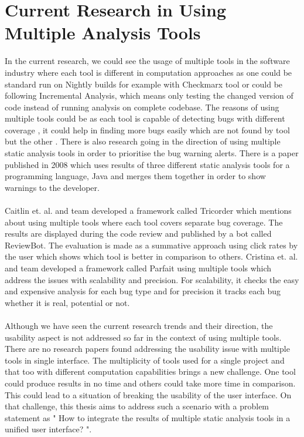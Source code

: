 \section{Current Research in Using Multiple Analysis Tools}

In the current research, we could see the usage of multiple tools in the software industry where each tool is different in computation approaches as one could be standard run on Nightly builds for example with Checkmarx \cite{checkmarx} tool or could be following Incremental Analysis, which means only testing the changed version of code instead of running analysis on complete codebase. The reasons of using multiple tools could be as each tool is capable of detecting bugs with different coverage \cite{bessey2010few} \cite{delaitre2015evaluating}, it could help in finding more bugs easily which are not found by tool but the other \cite{plakosh2014improving}. There is also research \cite{flynn2018prioritizing} going in the direction of using multiple static analysis tools in order to prioritise the bug warning alerts. There is a paper \cite{meng2008approach} published in 2008 which uses results of three different static analysis tools for a programming language, Java and merges them together in order to show warnings to the developer. \\ \\

Caitlin et. al. and team developed a framework called Tricorder \cite{tricorder} which mentions about using multiple tools where each tool covers separate bug coverage. The results are displayed during the code review and published by a bot called ReviewBot. The evaluation is made as a summative approach using click rates by the user which shows which tool is better in comparison to others. Cristina et. al. and team developed a framework called Parfait \cite{parfait} using multiple tools which address the issues with scalability and precision. For scalability, it checks the easy and expensive analysis for each bug type and for precision it tracks each bug whether it is real, potential or not. \\ \\

Although we have seen the current research trends and their direction, the usability aspect is not addressed so far in the context of using multiple tools. There are no research papers found addressing the usability issue with multiple tools in single interface. The multiplicity of tools used for a single project and that too with different computation capabilities brings a new challenge.  One tool could produce results in no time and others could take more time in comparison. This could lead to a situation of breaking the usability of the user interface. On that challenge, this thesis aims to address such a scenario with a problem statement as " How to integrate the results of multiple static analysis tools in a unified user interface? ".  \\ \\

